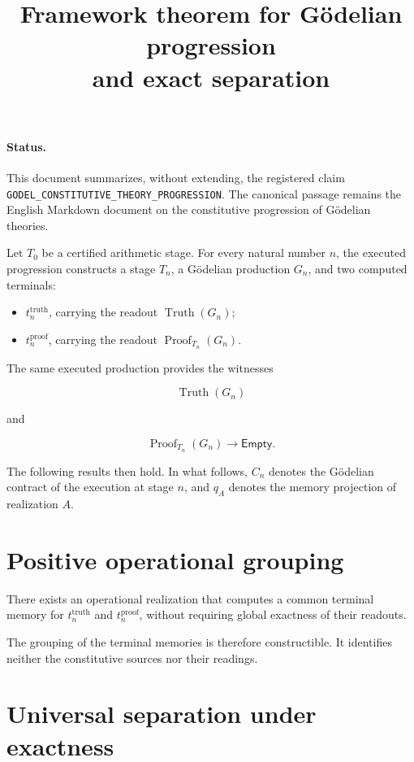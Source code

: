 \documentclass[11pt,a4paper]{article}
\title{Framework theorem for Gödelian progression\\
and exact separation}
\author{}
\date{}
\newcommand{\Truth}{\operatorname{Truth}}
\newcommand{\Proof}{\operatorname{Proof}}
\newcommand{\Empty}{\mathsf{Empty}}
\begin{document}
\maketitle

\paragraph{Status.}
This document summarizes, without extending, the registered claim
\texttt{GODEL\_CONSTITUTIVE\_THEORY\_PROGRESSION}. The canonical passage
remains the English Markdown document on the constitutive progression of
Gödelian theories.

Let $T_0$ be a certified arithmetic stage. For every natural number $n$, the
executed progression constructs a stage $T_n$, a Gödelian production $G_n$,
and two computed terminals:

\begin{itemize}
  \item $t^{\mathrm{truth}}_n$, carrying the readout $\Truth(G_n)$;
  \item $t^{\mathrm{proof}}_n$, carrying the readout $\Proof_{T_n}(G_n)$.
\end{itemize}

The same executed production provides the witnesses

\[
  \Truth(G_n)
\]

and

\[
  \Proof_{T_n}(G_n) \longrightarrow \Empty.
\]

The following results then hold. In what follows, $C_n$ denotes the Gödelian
contract of the execution at stage $n$, and $q_A$ denotes the memory projection
of realization $A$.

\section{Positive operational grouping}

There exists an operational realization that computes a common terminal
memory for $t^{\mathrm{truth}}_n$ and $t^{\mathrm{proof}}_n$, without requiring
global exactness of their readouts.

The grouping of the terminal memories is therefore constructible. It
identifies neither the constitutive sources nor their readings.

\section{Universal separation under exactness}
\end{document}
